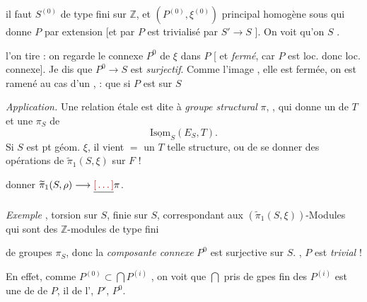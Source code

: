 \documentclass[11pt,a4paper]{article}
\begin{document}

il faut $S^{(0)}$ de type fini sur $\mathbb{Z}$, et $(P^{(0)}, \xi^{(0)})$
principal homogène sous \ill{} qui donne $P$ par extension \ill{} [et
\ill{} par $P$ est trivialisé par $S' \to S$ \ill{}]. On voit qu'on
 $S$ .

 l'on tire  : on regarde le
 connexe $P^0$ de $\xi$ dans $P$ [
 et \emph{fermé}, car $P$ est loc.
 donc loc. connexe]. Je dis que $P^0 \to S$ est
\emph{surjectif}. Comme l'image \ill{},  elle
est fermée, on est ramené au cas d'un ,
  : \ill{} que si $P$ est \ill{}
\ill{} sur $S$


\emph{Application.} Une relation étale est dite à \emph{groupe structural}
$\pi$,  \ill{} , qui \ill{} donne un  de $T$ \ill{} et une \ill{} $\pi_S$  de
\ill{}
\[
  \underline{\mathrm{Isom}}_S(E_S, T).
\]
Si $S$ est   pt géom. $\xi$, il vient
\ill{} $=$ \ill{}  un $T$ \ill{} \ill{} telle
structure, ou de se donner des opérations  de
$\widetilde{\pi}_1(S,\xi)$ \struck{\ill{}} sur $F$ !

\ill{} donner $\widetilde{\pi}_1(S,\rho) \longrightarrow \struck{\ill{}}\pi$.

\emph{Exemple} , \ill{} torsion sur
$S$,   finie sur $S$,
correspondant aux $(\widetilde{\pi}_1(S,\xi))$-Modules 
 qui sont des $\mathbb{Z}$-modules de type fini
\ill{}


\ill{} de groupes \ill{} \emph{$\pi_S$}, donc \ill{} la \emph{composante
connexe} $P^0$ est surjective sur $S$. \ill{}, \ill{} $P$ est
\emph{trivial} !

En effet, comme $P^{(0)} \subset \bigcap P^{(i)}$ \ill{}, on voit que
$\bigcap$ pris \ill{} \ill{} de gpes fin\ill{} \struck{\ill{}}
  des $P^{(i)}$ est une  de
 de $P$, il \ill{} de l',
\ill{} $P'$, \ill{} $P^0$.
\end{document}
